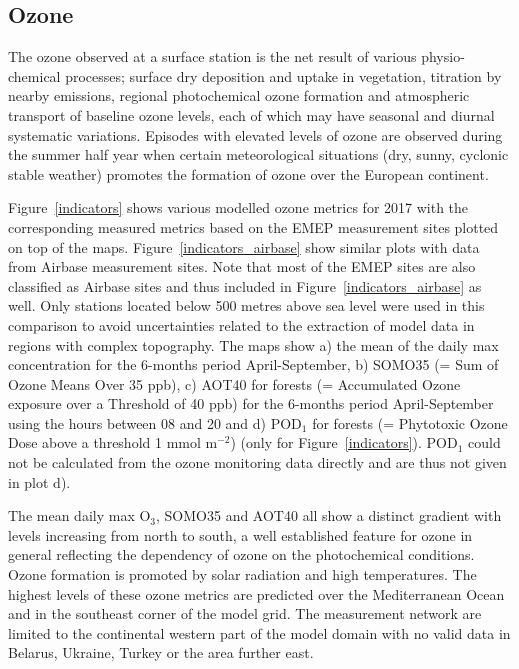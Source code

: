 \subsection{Ozone}
\label{O3MAX}

The ozone observed at a surface station is the net result of various physio-chemical processes; surface dry deposition and uptake in vegetation, titration by nearby \nox emissions, regional photochemical ozone formation and atmospheric transport of baseline ozone levels, each of which may have seasonal and diurnal systematic variations. Episodes with elevated levels of ozone are observed during the summer half year when certain meteorological situations (dry, sunny, cyclonic stable weather) promotes the formation of ozone over the European continent. 

Figure~\ref{indicators} shows various modelled ozone metrics for 2017 with the corresponding measured metrics based on the EMEP measurement sites plotted on top of the maps. Figure~\ref{indicators_airbase} show similar plots with data from Airbase measurement sites. Note that most of the EMEP sites are also classified as Airbase sites and thus included in Figure~\ref{indicators_airbase} as well. Only stations located below 500 metres above sea level were used in this comparison to avoid uncertainties related to the extraction of model data in regions with complex topography. The maps show a) the mean of the daily max concentration for the 6-months period April-September, b) SOMO35 (= Sum of Ozone Means Over 35 ppb), c) AOT40 for forests (= Accumulated Ozone exposure over a Threshold of 40 ppb) for the 6-months period April-September using the hours between 08 and 20 and d) POD$_1$ for forests (= Phytotoxic Ozone Dose above a threshold 1 mmol m$^{-2}$) (only for Figure~\ref{indicators}). POD$_1$ could not be calculated from the ozone monitoring data directly and are thus not given in plot d).

The mean daily max O$_3$, SOMO35 and AOT40 all show a distinct gradient with levels increasing from north to south, a well established feature for ozone in general reflecting the dependency of ozone on the photochemical conditions. Ozone formation is promoted by solar radiation and high temperatures. The highest levels of these ozone metrics are predicted over the Mediterranean Ocean and in the southeast corner of the model grid. The measurement network are limited to the continental western part of the model domain with no valid data in Belarus, Ukraine, Turkey or the area further east.

